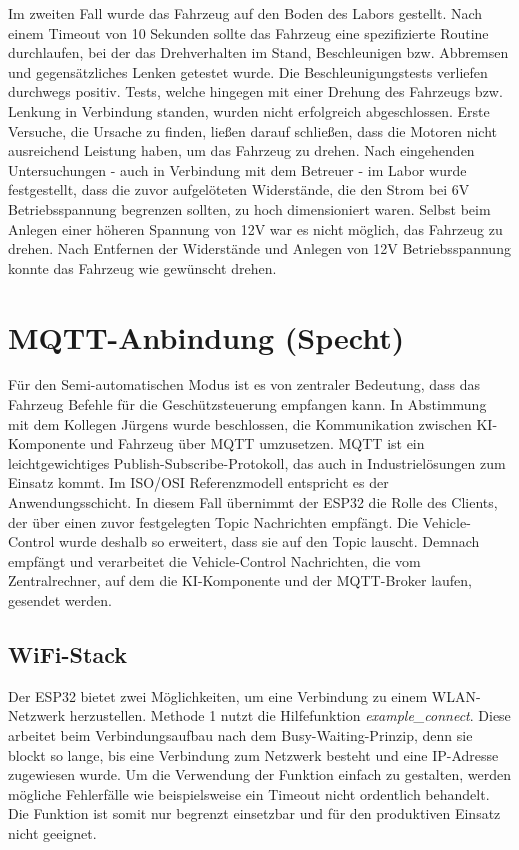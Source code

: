 Im zweiten Fall wurde das Fahrzeug auf den Boden des Labors gestellt. Nach einem Timeout von 10 Sekunden sollte das Fahrzeug eine spezifizierte Routine durchlaufen, bei der das Drehverhalten im Stand, Beschleunigen bzw. Abbremsen und gegensätzliches Lenken getestet wurde. Die Beschleunigungstests verliefen durchwegs positiv. Tests, welche hingegen mit einer Drehung des Fahrzeugs bzw. Lenkung in Verbindung standen, wurden nicht erfolgreich abgeschlossen. Erste Versuche, die Ursache zu finden, ließen darauf schließen, dass die Motoren nicht ausreichend Leistung haben, um das Fahrzeug zu drehen. Nach eingehenden Untersuchungen - auch in Verbindung mit dem Betreuer - im Labor wurde festgestellt, dass die zuvor aufgelöteten Widerstände, die den Strom bei 6V Betriebsspannung begrenzen sollten, zu hoch dimensioniert waren. Selbst beim Anlegen einer höheren Spannung von 12V war es nicht möglich, das Fahrzeug zu drehen. Nach Entfernen der Widerstände und Anlegen von 12V Betriebsspannung konnte das Fahrzeug wie gewünscht drehen. \newline

\section{MQTT-Anbindung (Specht)}

Für den Semi-automatischen Modus ist es von zentraler Bedeutung, dass das Fahrzeug Befehle für die Geschützsteuerung empfangen kann. In Abstimmung mit dem Kollegen Jürgens wurde beschlossen, die Kommunikation zwischen KI-Komponente und Fahrzeug über MQTT umzusetzen. MQTT ist ein leichtgewichtiges Publish-Subscribe-Protokoll, das auch in Industrielösungen zum Einsatz kommt. Im ISO/OSI Referenzmodell entspricht es der Anwendungsschicht. In diesem Fall übernimmt der ESP32 die Rolle des Clients, der über einen zuvor festgelegten Topic Nachrichten empfängt. Die Vehicle-Control wurde deshalb so erweitert, dass sie auf den Topic lauscht. Demnach empfängt und verarbeitet die Vehicle-Control Nachrichten, die vom Zentralrechner, auf dem die KI-Komponente und der MQTT-Broker laufen, gesendet werden. \newline

\subsection{WiFi-Stack}

Der ESP32 bietet zwei Möglichkeiten, um eine Verbindung zu einem WLAN-Netzwerk herzustellen. Methode 1 nutzt die Hilfefunktion \textit{example\_connect}. Diese arbeitet beim Verbindungsaufbau nach dem Busy-Waiting-Prinzip, denn sie blockt so lange, bis eine Verbindung zum Netzwerk besteht und eine IP-Adresse zugewiesen wurde. Um die Verwendung der Funktion einfach zu gestalten, werden mögliche Fehlerfälle wie beispielsweise ein Timeout nicht ordentlich behandelt. Die Funktion ist somit nur begrenzt einsetzbar und für den produktiven Einsatz nicht geeignet. \newline

